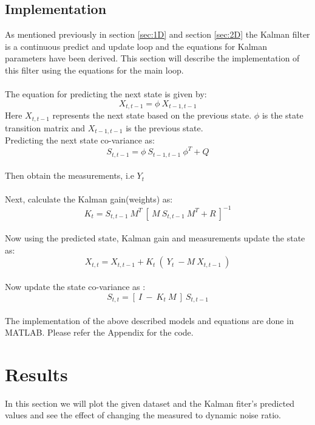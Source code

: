 \documentclass[12pt]{article}
\begin{document}
\subsection{Implementation}
\label{sec:implementation}
As mentioned previously in section \ref{sec:1D} and section \ref{sec:2D} the Kalman filter is a continuous predict and update loop and the equations for Kalman parameters have been derived. This section will describe the implementation of this filter using the equations for the main loop.\\
\\
The equation for predicting the next state is given by:
\begin{equation}
	X_{t,t-1} = \phi\  X_{t-1,t-1}
\label{eq:imp predict}
\end{equation}
Here $X_{t,t-1}$ represents the next state based on the previous state. $\phi$ is the state transition matrix and $X_{t-1,t-1}$ is the previous state.
\\
Predicting the next state co-variance as:
\begin{equation}
	S_{t,t-1} = \phi\  S_{t-1,t-1}\ \phi^T + Q
\label{eq:imp predict state co-var}
\end{equation}
\\
Then obtain the measurements, i.e $Y_t$ \\
\\
Next, calculate the Kalman gain(weights) as:
\begin{equation}
	K_t = S_{t,t-1}\ M^T\ [\ M\ S_{t,t-1}\ M^T + R\ ]^{-1}
\label{eq:imp kalman gain}
\end{equation}
\\
Now using the predicted state, Kalman gain and measurements update the state as:
\begin{equation}
	X_{t,t} = X_{t,t-1} + K_t\ (\ Y_t\ - M\ X_{t,t-1}\ )
\label{eq:imp state update}
\end{equation}
\\
Now update the state co-variance as :
\begin{equation}
	S_{t,t} = [\ I\ -\ K_t\ M\ ]\ S_{t,t-1}
\label{eq:imp state co-var update}
\end{equation}
\\
The implementation of the above described models and equations are done in MATLAB. Please refer the Appendix for the code.  
\section{Results}
In this section we will plot the given dataset and the Kalman fiter's predicted values and see the effect of changing the measured to dynamic noise ratio. \\
\end{document}
